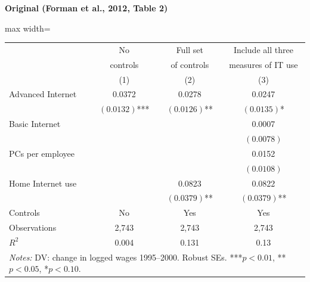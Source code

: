 \documentclass[11pt,a4paper]{article}
\begin{document}
\begin{minipage}[t]{0.48\textwidth}
\centering
\textbf{\large Original (Forman et al., 2012, Table 2)}
\vspace{0.3cm}

\begin{adjustbox}{max width=\textwidth}
\begin{tabular}{lccc}
\toprule
 & No & Full set & Include all three \\
 & controls & of controls & measures of IT use \\
 & (1) & (2) & (3) \\
\midrule
Advanced Internet & 0.0372 & 0.0278 & 0.0247 \\
 & $(0.0132)$*** & $(0.0126)$** & $(0.0135)$* \\[0.3em]
Basic Internet &  &  & 0.0007 \\
 &  &  & $(0.0078)$ \\[0.3em]
PCs per employee &  &  & 0.0152 \\
 &  &  & $(0.0108)$ \\[0.3em]
Home Internet use &  & 0.0823 & 0.0822 \\
 &  & $(0.0379)$** & $(0.0379)$** \\[0.3em]
\midrule
Controls & No & Yes & Yes \\
Observations & 2,743 & 2,743 & 2,743 \\
$R^2$ & 0.004 & 0.131 & 0.13 \\
\bottomrule
\multicolumn{4}{p{0.95\textwidth}}{\footnotesize\textit{Notes:} DV: change in logged wages 1995--2000. Robust SEs. ***$p<0.01$, **$p<0.05$, *$p<0.10$.}
\end{tabular}
\end{adjustbox}
\end{minipage}%
\hfill
\end{document}
